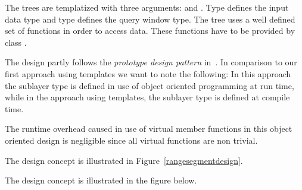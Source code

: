 The trees are templatized with three arguments:  
and . Type  defines
the input data type and type  defines the query
window type.  The tree uses a well defined set of functions in
order to access data. These functions have to be provided by
class . 


The design partly follows  the {\em prototype design pattern}
in~\cite{cgal:ghjv-dpero-95}. In comparison to our first approach
using templates we want to note the following: In this approach
the sublayer type is defined in
use of object oriented programming at run time, while in the
approach using templates, the sublayer type is defined at compile
time. 

The runtime overhead caused in use of virtual member
functions in this object oriented design is negligible since all virtual
functions are non trivial.
\begin{ccTexOnly}
The design concept is illustrated in Figure~\ref{rangesegmentdesign}.
\end{ccTexOnly}
\begin{ccHtmlOnly}
The design concept is illustrated in the figure below.
\end{ccHtmlOnly}


